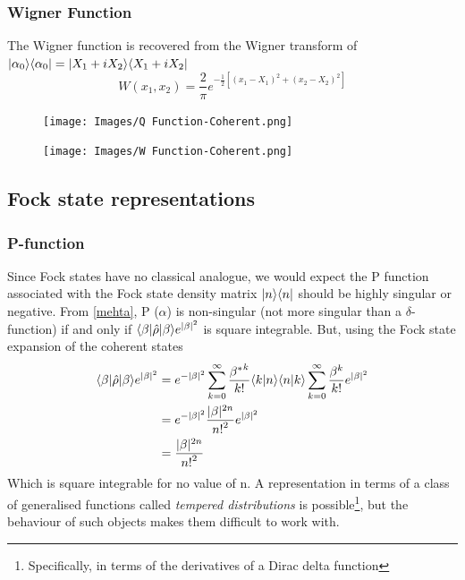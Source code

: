 \subsubsection{Wigner Function}
The Wigner function is recovered from the Wigner transform of $| \alpha_0 \rangle\langle\alpha_0 | = | X_1+iX_2 \rangle\langle X_1+iX_2 |$
\begin{equation}
	W(x_1, x_2) = \frac{2}{ \pi} e^{-\frac{1}{2}[{(x_1-X_1)}^2+{(x_2-X_2)}^2]}
\end{equation}
\begin{figure}[h]
	\begin{minipage}[b]{.5\linewidth}
		\centering \large \texttt{[image: Images/Q Function-Coherent.png]}
		\label{fig:Qcoh}
	\end{minipage}%
	\begin{minipage}[b]{.5\linewidth}
		\centering\large \texttt{[image: Images/W Function-Coherent.png]}
		\label{fig:Wcoh}
	\end{minipage}
\end{figure}
\subsection{Fock state representations}
\subsubsection{P-function}
Since Fock states have no classical analogue, we would expect the P function associated with the Fock state density matrix $| n \rangle\langle n |$ should be highly singular or negative. From \cref{mehta}, P ($\alpha$) is non-singular (not more singular than a $\delta$-function) if and only if $ \langle\beta | \hat{\rho} | \beta \rangle e^{|\beta|^2} $ is square integrable. But, using the Fock state expansion of the coherent states
\begin{align}
	 \langle\beta | \hat{\rho} | \beta \rangle e^{|\beta|^2}  &= e^{-|\beta|^2} \sum_{k=0}^\infty \frac {{\beta^*}^k}{k!} \langle k | n \rangle\langle n | k \rangle \sum_{k=0}^\infty \frac {\beta^k}{k!}e^{|\beta|^2} \\ &= e^{-|\beta|^2} \frac{|\beta|^{2n}}{{n!}^2} e^{|\beta|^2} \\ &= \frac{|\beta|^{2n}}{{n!}^2}
\end{align}
Which is square integrable for no value of n.
A representation in terms of a class of generalised functions called \emph{tempered distributions} is possible\footnote{Specifically, in terms of the derivatives of a Dirac delta function\autocite{Gerry2005}}, but the behaviour of such objects makes them difficult to work with.
